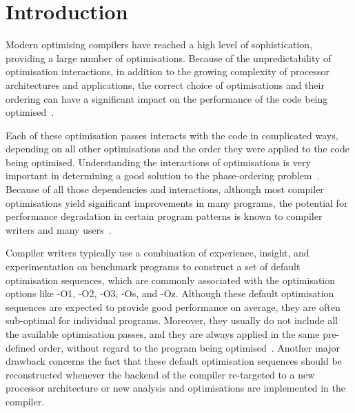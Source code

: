 
\chapter{Introduction}

Modern optimising compilers have reached a high level of sophistication, providing a large number of optimisations.
Because of the unpredictability of optimisation interactions, in addition to the growing complexity of processor architectures and applications, the correct choice of optimisations and their ordering can have a significant impact on the performance of the code being optimised~\citep{pan06,fursin07,kulkarni12,purini13}.

Each of these optimisation passes interacts with the code in complicated ways, depending on all other optimisations and the order they were applied to the code being optimised.
Understanding the interactions of optimisations is very important in determining a good solution to the phase-ordering problem~\citep{touati06,kulkarni12}.
Because of all those dependencies and interactions, although most compiler optimisations yield significant improvements in many programs, the potential for performance degradation in certain program patterns is known to compiler writers and many users~\citep{pan06,zhou12,kulkarni12}.

Compiler writers typically use a combination of experience, insight, and experimentation on benchmark programs to construct a set of default optimisation sequences,
which are commonly associated with the optimisation options like {\flagstype -O1}, {\flagstype -O2}, {\flagstype -O3}, {\flagstype -Os}, and {\flagstype -Oz}.
Although these default optimisation sequences are expected to provide good performance on average, they are often sub-optimal for individual programs.
Moreover, they usually do not include all the available optimisation passes, and they are always applied in the same pre-defined order, without regard to the program being optimised~\citep{pan06,cavazos07,zhou12,kulkarni12}.
Another major drawback concerns the fact that these default optimisation sequences should be reconstructed whenever the backend of the compiler re-targeted to a new processor architecture or new analysis and optimisations are implemented in the compiler.

